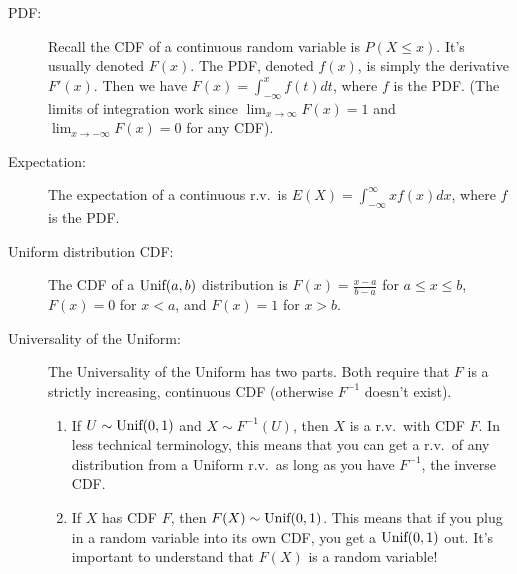 \documentclass{article}
\begin{document}
\begin{description}

\item[PDF: ]

Recall the CDF of a continuous random variable is $P(X \leq x)$. It's usually denoted $F(x)$. The PDF, denoted $f(x)$, is simply the derivative $F'(x)$. Then we have $F(x) = \int_{-\infty}^x f(t)dt$, where $f$ is the PDF. (The limits of integration work since $\lim_{x \rightarrow \infty} F(x) = 1$ and $\lim_{x \rightarrow -\infty} F(x) = 0$ for any CDF).

\item[Expectation: ]

The expectation of a continuous r.v.~is $E(X) = \int_{-\infty}^\infty xf(x)dx$, where $f$ is the PDF.

\item[Uniform distribution CDF: ]

The CDF of a $\textrm{Unif}(a, b)$ distribution is $F(x) = \frac{x - a}{b - a}$ for $a \leq x \leq b$, $F(x) = 0$ for $x < a$, and $F(x) = 1$ for $x > b$.

\item[Universality of the Uniform: ]

The Universality of the Uniform has two parts. Both require that $F$ is a strictly increasing, continuous CDF (otherwise $F^{-1}$ doesn't exist).
\begin{enumerate}
    \item If $U \sim \textrm{Unif}(0, 1)$ and $X \sim F^{-1}(U)$, then $X$ is a r.v.~with CDF $F$. In less technical terminology, this means that you can get a r.v.~of any distribution from a Uniform r.v.~as long as you have $F^{-1}$, the inverse CDF.
    
    \item If $X$ has CDF $F$, then $F(X) \sim \textrm{Unif}(0, 1)$. This means that if you plug in a random variable into its own CDF, you get a $\textrm{Unif}(0, 1)$ out. It's important to understand that $F(X)$ is a random variable!
\end{enumerate}

\end{description}


    
\end{document}
